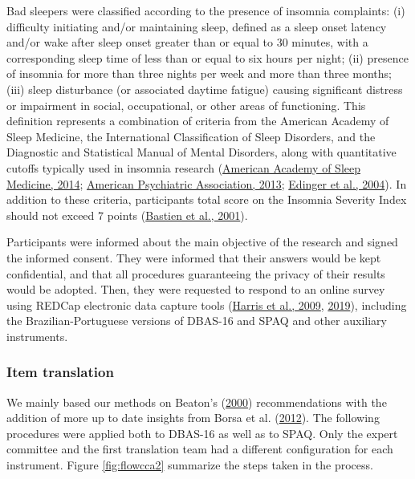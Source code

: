 \documentclass[
  ,doc,11pt, twoside,floatsintext]{apa6}
\begin{document}
Bad sleepers were classified according to the presence of insomnia complaints: (i) difficulty initiating and/or maintaining sleep, defined as a sleep onset latency and/or wake after sleep onset greater than or equal to 30 minutes, with a corresponding sleep time of less than or equal to six hours per night; (ii) presence of insomnia for more than three nights per week and more than three months; (iii) sleep disturbance (or associated daytime fatigue) causing significant distress or impairment in social, occupational, or other areas of functioning. This definition represents a combination of criteria from the American Academy of Sleep Medicine, the International Classification of Sleep Disorders, and the Diagnostic and Statistical Manual of Mental Disorders, along with quantitative cutoffs typically used in insomnia research (\protect\hyperlink{ref-icds2014}{American Academy of Sleep Medicine, 2014}; \protect\hyperlink{ref-americanpsychiatricassociation2013}{American Psychiatric Association, 2013}; \protect\hyperlink{ref-edinger2004}{Edinger et al., 2004}). In addition to these criteria, participants total score on the Insomnia Severity Index should not exceed 7 points (\protect\hyperlink{ref-bastien2001}{Bastien et al., 2001}).

Participants were informed about the main objective of the research and signed the informed consent. They were informed that their answers would be kept confidential, and that all procedures
guaranteeing the privacy of their results would be adopted. Then, they were requested to respond to an online survey using REDCap electronic data capture tools (\protect\hyperlink{ref-harris2009research}{Harris et al., 2009}, \protect\hyperlink{ref-harris2019redcap}{2019}), including the Brazilian-Portuguese versions of DBAS-16 and SPAQ and other auxiliary instruments.

\hypertarget{item-translation}{%
\subsubsection{Item translation}\label{item-translation}}

We mainly based our methods on Beaton's (\protect\hyperlink{ref-beaton2000}{2000}) recommendations with the addition of more up to date insights from Borsa et al. (\protect\hyperlink{ref-borsaAdaptacaoValidacaoInstrumentos2012}{2012}). The following procedures were applied both to DBAS-16 as well as to SPAQ. Only the expert committee and the first translation team had a different configuration for each instrument.
Figure \ref{fig:flowcca2} summarize the steps taken in the process.
\end{document}
